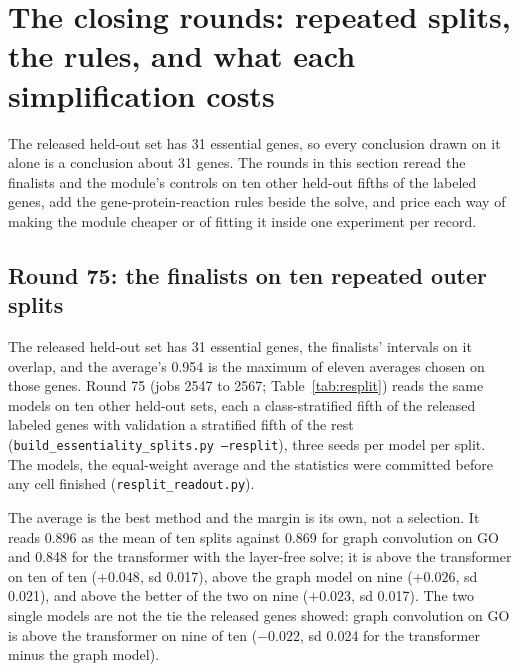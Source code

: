 
\section{The closing rounds: repeated splits, the rules, and what each simplification costs}
\label{sec:closing}

The released held-out set has 31 essential genes, so every conclusion drawn on it alone
is a conclusion about 31 genes. The rounds in this section reread the finalists and the
module's controls on ten other held-out fifths of the labeled genes, add the
gene-protein-reaction rules beside the solve, and price each way of making the module
cheaper or of fitting it inside one experiment per record.

\subsection{Round 75: the finalists on ten repeated outer splits}
\label{sec:round75}

The released held-out set has 31 essential genes, the finalists' intervals on it overlap,
and the average's 0.954 is the maximum of eleven averages chosen on those genes. Round 75
(jobs 2547 to 2567; Table~\ref{tab:resplit}) reads the same models on ten other held-out
sets, each a class-stratified fifth of the released labeled genes with validation a
stratified fifth of the rest (\texttt{build\_essentiality\_splits.py --resplit}), three
seeds per model per split. The models, the equal-weight average and the statistics were
committed before any cell finished (\texttt{resplit\_readout.py}).



The average is the best method and the margin is its own, not a selection. It reads 0.896
as the mean of ten splits against 0.869 for graph convolution on GO and 0.848 for the
transformer with the layer-free solve; it is above the transformer on ten of ten
($+0.048$, sd 0.017), above the graph model on nine ($+0.026$, sd 0.021), and above the
better of the two on nine ($+0.023$, sd 0.017). The two single models are not the tie the
released genes showed: graph convolution on GO is above the transformer on nine of ten
($-0.022$, sd 0.024 for the transformer minus the graph model).

